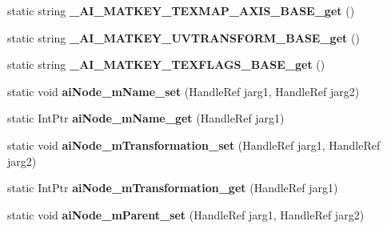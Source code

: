 \begin{DoxyCompactItemize}
\item 
\hypertarget{class_assimp_p_i_n_v_o_k_e_aa9bd5d03c6287ab5f8ca0231ce52eb44}{static string {\bfseries \+\_\+\+A\+I\+\_\+\+M\+A\+T\+K\+E\+Y\+\_\+\+T\+E\+X\+M\+A\+P\+\_\+\+A\+X\+I\+S\+\_\+\+B\+A\+S\+E\+\_\+get} ()}\label{class_assimp_p_i_n_v_o_k_e_aa9bd5d03c6287ab5f8ca0231ce52eb44}

\item 
\hypertarget{class_assimp_p_i_n_v_o_k_e_a0018e5d7ce5d931ad1d33f1bb1208518}{static string {\bfseries \+\_\+\+A\+I\+\_\+\+M\+A\+T\+K\+E\+Y\+\_\+\+U\+V\+T\+R\+A\+N\+S\+F\+O\+R\+M\+\_\+\+B\+A\+S\+E\+\_\+get} ()}\label{class_assimp_p_i_n_v_o_k_e_a0018e5d7ce5d931ad1d33f1bb1208518}

\item 
\hypertarget{class_assimp_p_i_n_v_o_k_e_a9ea027fc21f9038e4eef01c277cf7947}{static string {\bfseries \+\_\+\+A\+I\+\_\+\+M\+A\+T\+K\+E\+Y\+\_\+\+T\+E\+X\+F\+L\+A\+G\+S\+\_\+\+B\+A\+S\+E\+\_\+get} ()}\label{class_assimp_p_i_n_v_o_k_e_a9ea027fc21f9038e4eef01c277cf7947}

\item 
\hypertarget{class_assimp_p_i_n_v_o_k_e_a42716c4afa53f1d59503946aa601ddf0}{static void {\bfseries ai\+Node\+\_\+m\+Name\+\_\+set} (Handle\+Ref jarg1, Handle\+Ref jarg2)}\label{class_assimp_p_i_n_v_o_k_e_a42716c4afa53f1d59503946aa601ddf0}

\item 
\hypertarget{class_assimp_p_i_n_v_o_k_e_a7a85ab10c9cbb4673d74b0b3088cbbac}{static Int\+Ptr {\bfseries ai\+Node\+\_\+m\+Name\+\_\+get} (Handle\+Ref jarg1)}\label{class_assimp_p_i_n_v_o_k_e_a7a85ab10c9cbb4673d74b0b3088cbbac}

\item 
\hypertarget{class_assimp_p_i_n_v_o_k_e_a923a2cba07093e4a0c4cb9c4d8a3b81e}{static void {\bfseries ai\+Node\+\_\+m\+Transformation\+\_\+set} (Handle\+Ref jarg1, Handle\+Ref jarg2)}\label{class_assimp_p_i_n_v_o_k_e_a923a2cba07093e4a0c4cb9c4d8a3b81e}

\item 
\hypertarget{class_assimp_p_i_n_v_o_k_e_ac89c75c0fc4ea4b067ef27056b902d83}{static Int\+Ptr {\bfseries ai\+Node\+\_\+m\+Transformation\+\_\+get} (Handle\+Ref jarg1)}\label{class_assimp_p_i_n_v_o_k_e_ac89c75c0fc4ea4b067ef27056b902d83}

\item 
\hypertarget{class_assimp_p_i_n_v_o_k_e_a656d3b58cbb057736b8cac0d717311b5}{static void {\bfseries ai\+Node\+\_\+m\+Parent\+\_\+set} (Handle\+Ref jarg1, Handle\+Ref jarg2)}\label{class_assimp_p_i_n_v_o_k_e_a656d3b58cbb057736b8cac0d717311b5}


\end{DoxyCompactItemize}
